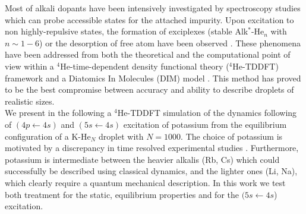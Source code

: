 Most of alkali dopants have been intensively investigated by spectroscopy studies\cite{Sti1996,Lac2011,Lac2012,Bru2001,Her2012,Log2014,Log2015} which can probe accessible states for the attached impurity.
Upon excitation to non highly-repulsive states, the formation of exciplexes (stable Alk$^*$-He$_n$ with $n\sim 1-6$) or the desorption of free atom have been observed \cite{Lac2011,Bru2001,Reh2000A,Reh2000B,Sch2001}. 
These phenomena have been addressed from both the theoretical and the computational point of view within a $^4$He-time-dependent density functional theory ($^4$He-TDDFT) framework and a Diatomics In Molecules (DIM) model \cite{Log2015,Her2012,Van2017,Zbi2005}.
This method has proved to be the best compromise between accuracy and ability to describe droplets of realistic sizes.\\

We present in the following a $^4$He-TDDFT simulation of the dynamics following  of $(4p\gets 4s)$ and $(5s\gets 4s)$ excitation of potassium from the equilibrium configuration of a K-He$_N$ droplet with $N=1000$. 
The choice of potassium is motivated by a discrepancy in time resolved experimental studies \cite{Reh2000A,Reh2000B,Sch2001}. 
Furthermore, potassium is intermediate between the heavier alkalis (Rb, Cs) which could successfully be described using classical dynamics, and the lighter ones (Li, Na), which clearly require a quantum mechanical description.
In this work we test both treatment for the static, equilibrium properties and for the $(5s\gets 4s$) excitation.